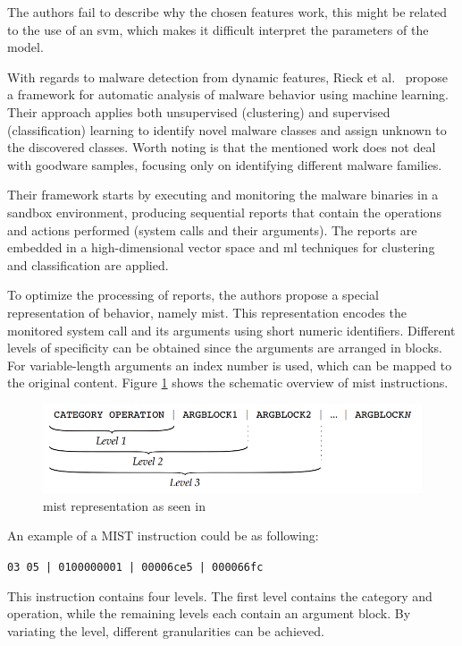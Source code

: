 The authors fail to describe why the chosen features work, this might be related to the use of an \gls{svm}, which makes it difficult interpret the parameters of the model.

\medskip

With regards to malware detection from dynamic features, Rieck et al.~\cite{rieck:dynamic} propose a framework for automatic analysis of malware behavior using machine learning.
Their approach applies both unsupervised (clustering) and supervised (classification) learning to identify novel malware classes and assign unknown to the discovered classes.
Worth noting is that the mentioned work does not deal with goodware samples, focusing only on identifying different malware families.

Their framework starts by executing and monitoring the malware binaries in a sandbox environment, producing sequential reports that contain the operations and actions performed (system calls and their arguments).
The reports are embedded in a high-dimensional vector space and \gls{ml} techniques for clustering and classification are applied.

To optimize the processing of reports, the authors propose a special representation of behavior, namely \gls{mist}.
This representation encodes the monitored system call and its arguments using short numeric identifiers.
Different levels of specificity can be obtained since the arguments are arranged in blocks.
For variable-length arguments an index number is used, which can be mapped to the original content. Figure \ref{fig:mist} shows the schematic overview of \gls{mist} instructions.

\begin{figure}[!htb]
	\centering
	\includegraphics[width=0.7\columnwidth]{Figures/mist.png}
	\caption{\gls{mist} representation as seen in \cite{rieck:dynamic}}
	\label{fig:mist}
\end{figure}

An example of a MIST instruction could be as following:

\begin{center}\texttt{03 05 | 0100000001 | 00006ce5 | 000066fc}\end{center}

This instruction contains four levels.
The first level contains the category and operation, while the remaining levels each contain an argument block.
By variating the level, different granularities can be achieved.

